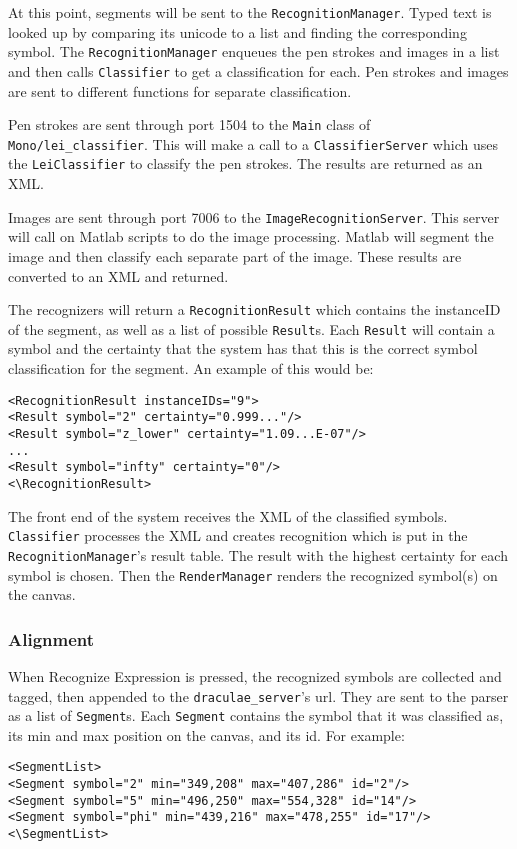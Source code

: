 \documentclass[letterpaper]{article}
\begin{document}
At this point, segments will be sent to the \verb+RecognitionManager+. Typed text is
looked up by comparing its unicode to a list and finding the corresponding symbol. The
\verb+RecognitionManager+ enqueues the pen strokes and images in a list and then calls
\verb+Classifier+ to get a classification for each. Pen strokes and images are sent to
different functions for separate classification.

Pen strokes are sent through port 1504 to the \verb+Main+ class of \verb+Mono/lei_classifier+.
This will make a call to a \verb+ClassifierServer+ which uses the \verb+LeiClassifier+ to
classify the pen strokes. The results are returned as an XML.

Images are sent through port 7006 to the \verb+ImageRecognitionServer+. This server will
call on Matlab scripts to do the image processing. Matlab will segment the image and then
classify each separate part of the image. These results are converted to an XML and returned.

The recognizers will return a \verb+RecognitionResult+ which contains the instanceID of the
segment, as well as a list of possible \verb+Result+s. Each \verb+Result+ will contain a
symbol and the certainty that the system has that this is the correct symbol classification
for the segment. An example of this would be:
\begin{verbatim}<RecognitionResult instanceIDs="9">
<Result symbol="2" certainty="0.999..."/>
<Result symbol="z_lower" certainty="1.09...E-07"/>
...
<Result symbol="infty" certainty="0"/>
<\RecognitionResult>\end{verbatim}

The front end of the system receives the XML of the classified symbols. \verb+Classifier+
processes the XML and creates recognition which is put in the \verb+RecognitionManager+'s
result table. The result with the highest certainty for each symbol is chosen. Then the
\verb+RenderManager+ renders the recognized symbol(s) on the canvas.

\subsubsection*{Alignment}
When Recognize Expression is pressed, the recognized symbols are collected and tagged,
then appended to the \verb+draculae_server+'s url. They are sent to the parser as a list
of \verb+Segment+s. Each \verb+Segment+ contains the symbol that it was classified as,
its min and max position on the canvas, and its id. For example:
\begin{verbatim}<SegmentList>
<Segment symbol="2" min="349,208" max="407,286" id="2"/>
<Segment symbol="5" min="496,250" max="554,328" id="14"/>
<Segment symbol="phi" min="439,216" max="478,255" id="17"/>
<\SegmentList>\end{verbatim}
\end{document}
